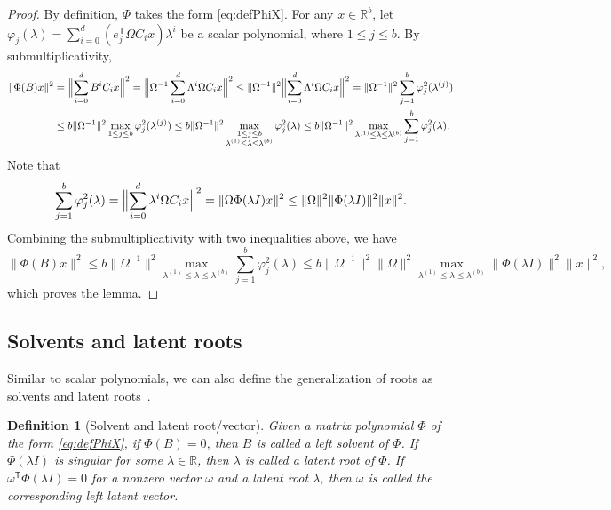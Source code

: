 \documentclass{article}
\newtheorem{definition}{Definition}
\newcommand{\Ttran}{\mathsf{T}}
\newcommand{\R}{\mathbb{R}}
\providecommand{\norm}[1]{\lVert#1\rVert}
\providecommand{\Bignorm}[1]{\Bigl\lVert#1\Bigr\rVert}
\begin{document}
\begin{proof}
    By definition, $\Phi$ takes the form \cref{eq:defPhiX}. For any $x\in\R^{b}$, let $\varphi_{j}(\lambda) = \sum_{i=0}^{d} (e_{j}^{\Ttran}\Omega C_{i}x)\lambda^{i}$ be a scalar polynomial, where $1\leq j\leq b$. By submultiplicativity, 
    \begin{equation*}
        \begin{aligned}
            \norm{\Phi(B)x}^{2} &= \Bignorm{\sum_{i=0}^{d}B^{i}C_{i}x}^{2} = \Bignorm{\Omega^{-1}\sum_{i=0}^{d}\Lambda^{i}\Omega C_{i}x}^{2} 
            \leq \norm{\Omega^{-1}}^{2}\Bignorm{\sum_{i=0}^{d}\Lambda^{i}\Omega C_{i}x}^{2}  
            = \norm{\Omega^{-1}}^{2}\sum_{j=1}^{b}\varphi_{j}^{2}(\lambda^{(j)})  \\ 
            &\leq b\norm{\Omega^{-1}}^{2}\max_{1\leq j\leq b}\varphi_{j}^{2}(\lambda^{(j)}) 
            \leq b\norm{\Omega^{-1}}^{2}\max_{\substack{1\leq j\leq b\\ \lambda^{(1)}\leq \lambda \leq \lambda^{(b)}}} \varphi_{j}^{2}(\lambda)  
            \leq b\norm{\Omega^{-1}}^{2}\max_{\lambda^{(1)}\leq \lambda \leq \lambda^{(b)}}\sum_{j=1}^{b}\varphi_{j}^{2}(\lambda).
        \end{aligned}
    \end{equation*}
    Note that
    \begin{equation*}
        \sum_{j=1}^{b}\varphi_{j}^{2}(\lambda) = \Bignorm{\sum_{i=0}^{d}\lambda^{i}\Omega C_{i}x}^{2} = \norm{\Omega\Phi(\lambda I)x}^{2}\leq \norm{\Omega}^{2} \norm{\Phi(\lambda I)}^{2}\norm{x}^{2}.
    \end{equation*}
    Combining the submultiplicativity with two inequalities above, we have 
    \begin{equation*}
        \norm{\Phi(B)x}^{2} \leq   b\norm{\Omega^{-1}}^{2}\max_{\lambda^{(1)}\leq \lambda \leq \lambda^{(b)}}\sum_{j=1}^{b}\varphi_{j}^{2}(\lambda)
        \leq b\norm{\Omega^{-1}}^{2}\norm{\Omega}^{2} \max_{\lambda^{(1)}\leq \lambda \leq \lambda^{(b)}}\norm{\Phi(\lambda I)}^{2}\norm{x}^{2},
    \end{equation*}
    which proves the lemma.
\end{proof}

\subsection{Solvents and latent roots}
Similar to scalar polynomials, we can also define the generalization of roots as solvents and latent roots~\cite[Sec.~1]{Dennis1976}.
\begin{definition}[Solvent and latent root/vector]
    Given a matrix polynomial $\Phi$ of the form \cref{eq:defPhiX}, if $\Phi(B)=0$, then $B$ is called a left solvent of $\Phi$. If $\Phi(\lambda I)$ is singular for some $\lambda\in\R$, then $\lambda$ is called a latent root of $\Phi$. If $\omega^{\Ttran}\Phi(\lambda I)=0$ for a nonzero vector $\omega$ and a latent root $\lambda$, then $\omega$ is called the corresponding left latent vector.
\end{definition}
\end{document}
